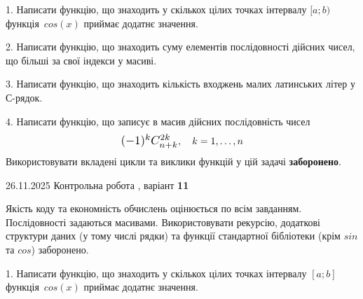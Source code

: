 \documentclass[11pt, ukrainian]{article}
\begin{document}
{{{{{{{{{{\vspace{2mm}

\begin {large}
1. Написати функцію, що знаходить у скількох цілих точках інтервалу $[a; b)$ функція~$cos(x)$ приймає додатнє значення.

\vspace{2mm}


2. Написати функцію, що знаходить суму елементів послідовності дійсних чисел, що більші за свої індекси у масиві.

\vspace{2mm}


3. Написати функцію, що знаходить кількість входжень малих латинських літер у С-рядок.

\vspace{2mm}


4. 
Написати функцію, що записує в масив дійсних послідовність чисел
$$\scalebox{1.2}{$(-1)^{k}C_{n+k}^{2k}$}, \quad k=1,\ldots,n$$
\quad Використовувати вкладені цикли та виклики функцій у цій задачі \textbf{заборонено}.

\vspace{2mm}

\end{large}
\vspace{20mm}


{{26.11.2025 Контрольна робота , варіант  \No \textbf { 11 }\par}}


{
Якість коду та економність обчислень оцінюється по всім завданням. Послідовності задаються масивами. Використовувати рекурсію, додаткові структури даних (у тому числі рядки) та функції стандартної бібліотеки (крім $sin$ та $cos$) заборонено.

\vspace{2mm}

\begin {large}
1. Написати функцію, що знаходить у скількох цілих точках інтервалу $[a; b]$ функція~$cos(x)$ приймає додатнє значення.


\end{large}}}}}}}}}}}}
\end{document}
